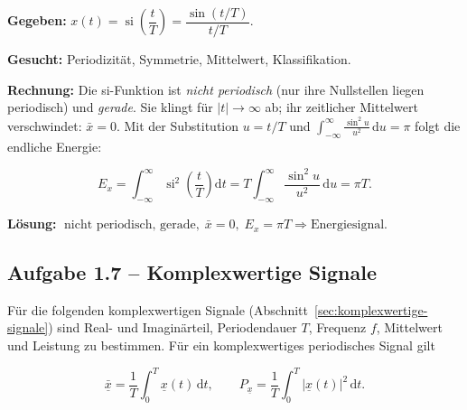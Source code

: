 \begin{beispiel}

\textbf{Gegeben:} $x(t) = \operatorname{si}\!\left(\dfrac{t}{T}\right)
= \dfrac{\sin(t/T)}{t/T}$.

\textbf{Gesucht:} Periodizität, Symmetrie, Mittelwert, Klassifikation.

\textbf{Rechnung:} Die si-Funktion ist \emph{nicht periodisch} (nur ihre
Nullstellen liegen periodisch) und \emph{gerade}. Sie klingt für
$|t| \to \infty$ ab; ihr zeitlicher Mittelwert verschwindet:
$\bar{x} = 0$. Mit der Substitution $u = t/T$ und
$\int_{-\infty}^{\infty}\frac{\sin^2 u}{u^2}\,\mathrm{d}u = \pi$ folgt die
endliche Energie:

$$
E_x = \int_{-\infty}^{\infty} \operatorname{si}^2\!\left(\frac{t}{T}\right)
      \mathrm{d}t
    = T\int_{-\infty}^{\infty} \frac{\sin^2 u}{u^2}\,\mathrm{d}u
    = \pi T.
$$

\begin{center}
\end{center}

\textbf{Lösung:}
$\boxed{\;\text{nicht periodisch, gerade},\; \bar{x} = 0,\;
E_x = \pi T \Rightarrow \text{Energiesignal.}\;}$

\end{beispiel}

\subsection*{Aufgabe 1.7 – Komplexwertige Signale}

Für die folgenden komplexwertigen Signale
(Abschnitt~\ref{sec:komplexwertige-signale}) sind Real- und Imaginärteil,
Periodendauer $T$, Frequenz $f$, Mittelwert und Leistung zu bestimmen. Für ein
komplexwertiges periodisches Signal gilt

$$
\bar{\underline{x}} = \frac{1}{T}\int_0^T \underline{x}(t)\,\mathrm{d}t,
\qquad
P_{\underline{x}} = \frac{1}{T}\int_0^T |\underline{x}(t)|^2\,\mathrm{d}t.
$$

